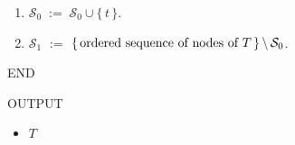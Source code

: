 \begin{center}
\begin{tcolorbox}[width=0.90\linewidth,colback=white,colframe=gray]
\begin{center}
\begin{minipage}{0.85\linewidth}
\begin{enumerate}
\begin{equation*}
	T \;\; := \;\;
	\left\{\begin{array}{ll}
		T_{(t)}\,, & \textnormal{if}\;\; {\color{red}C(\,t\,) + \alpha \,\leq\, C_{\alpha}(\,T^{(t)})}
		\\
		T\,, & \overset{{\color{white}1}}{\textnormal{otherwise}}
		\end{array}\right.
	\end{equation*}
\item
	$\mathcal{S}_{0} \; := \; \mathcal{S}_{0} \cup \{\,t\,\}$.
\item
	$\mathcal{S}_{1}$
	\;$:=$\;
		$\left\{\,\textnormal{ordered sequence of nodes of $T$}\,\right\} \backslash \, \mathcal{S}_{0}$.
\end{enumerate}
END
\end{minipage}
\end{center}
\vskip 0.3cm
OUTPUT
\begin{itemize}
\item
	$T$
\end{itemize}
\vskip 0.1cm
\end{tcolorbox}
\end{center}

